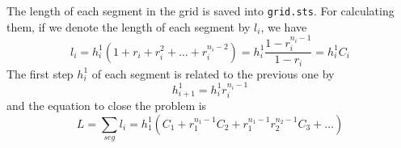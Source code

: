 The length of each segment in the grid is saved into {\tt grid.sts}. For
calculating them, if we denote the length of each segment by $l_i$, we have
\begin{equation}
l_i = h_i^1(1+r_i+r_i^2+\ldots+r_i^{n_i-2})=
h_i^1\frac{1-r_i^{n_i-1}}{1-r_i}=h_i^1C_i
\end{equation}
The first step $h_i^1$ of each segment is related to the previous one by
\begin{equation}
h_{i+1}^1 = h_i^1 r_i^{n_i-1}
\end{equation}
and the equation to close the problem is
\begin{equation}
L=\sum_{seg}l_i=h_1^1\left( C_1 + r_1^{n_1-1}C_2 + 
r_1^{n_1-1}r_2^{n_2-1}C_3 + \ldots \right)
\end{equation}

